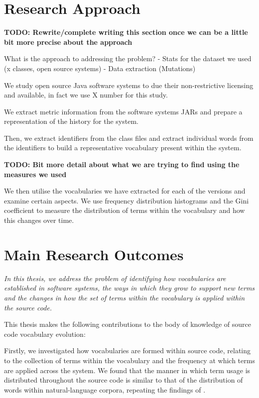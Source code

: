 
\section{Research Approach} %
\label{sec:research_approach}

\textbf{TODO: Rewrite/complete writing this section once we can be a little bit more precise about the approach}

What is the approach to addressing the problem?
- Stats for the dataset we used (x classes, open source systems)
- Data extraction (Mutations)

We study open source Java software systems to due their non-restrictive licensing and available, in fact we use X number for this study.

We extract metric information from the software systems JARs and prepare a representation of the history for the system.

Then, we extract identifiers from the class files and extract individual words from the identifiers to build a representative vocabulary present within the system.

\textbf{TODO: Bit more detail about what we are trying to find using the measures we used}

We then utilise the vocabularies we have extracted for each of the versions and examine certain aspects. We use frequency distribution histograms and the Gini coefficient to measure the distribution of terms within the vocabulary and how this changes over time.


\section{Main Research Outcomes} %
\label{sec:main_research_outcomes}

\emph{In this thesis, we address the problem of identifying how vocabularies are established in software systems, the ways in which they grow to support new terms and the changes in how the set of terms within the vocabulary is applied within the source code.}

This thesis makes the following contributions to the body of knowledge of source code vocabulary evolution:

Firstly, we investigated how vocabularies are formed within source code, relating to the collection of terms within the vocabulary and the frequency at which terms are applied across the system. We found that the manner in which term usage is distributed throughout the source code is similar to that of the distribution of words within natural-language corpora, repeating the findings of \cite{Pierret09a}.

